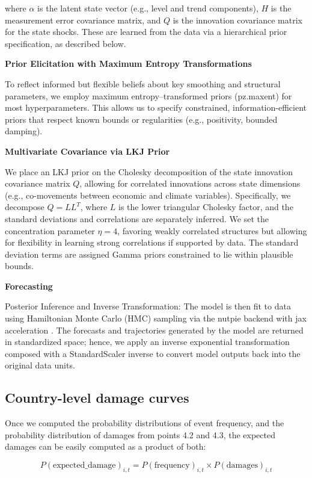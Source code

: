 where $\alpha$ is the latent state vector (e.g., level and trend components), $H$ is the measurement error covariance matrix, and $Q$ is the innovation covariance matrix for the state shocks. These are learned from the data via a hierarchical prior specification, as described below.

\textbf{Prior Elicitation with Maximum Entropy Transformations}

To reflect informed but flexible beliefs about key smoothing and structural parameters, we employ maximum entropy--transformed priors (pz.maxent) for most hyperparameters. This allows us to specify constrained, information-efficient priors that respect known bounds or regularities (e.g., positivity, bounded damping).

\textbf{Multivariate Covariance via LKJ Prior}

We place an LKJ prior on the Cholesky decomposition of the state innovation covariance matrix $Q$, allowing for correlated innovations across state dimensions (e.g., co-movements between economic and climate variables). Specifically, we decompose $Q = LL^T$, where $L$ is the lower triangular Cholesky factor, and the standard deviations and correlations are separately inferred. We set the concentration parameter $\eta=4$, favoring weakly correlated structures but allowing for flexibility in learning strong correlations if supported by data. The standard deviation terms are assigned Gamma priors constrained to lie within plausible bounds.

\textbf{Forecasting}

Posterior Inference and Inverse Transformation: The model is then fit to data using Hamiltonian Monte Carlo (HMC) sampling via the nutpie backend \citep{nutpie2023} with jax acceleration \citep{jax2018}. The forecasts and trajectories generated by the model are returned in standardized space; hence, we apply an inverse exponential transformation composed with a StandardScaler inverse to convert model outputs back into the original data units.

\subsection{Country-level damage curves}

Once we computed the probability distributions of event frequency, and the probability distribution of damages from points 4.2 and 4.3, the expected damages can be easily computed as a product of both:

\begin{equation}
P(\text{expected\_damage})_{i,t} = P(\text{frequency})_{i,t} \times P(\text{damages})_{i,t}
\end{equation}

